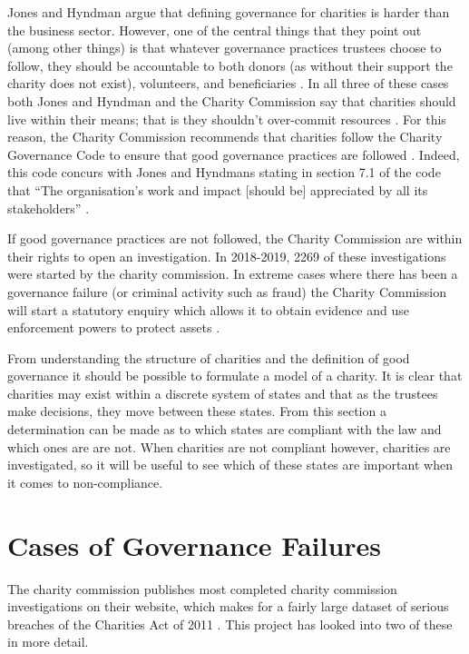 \documentclass{UoYCSproject}
\begin{document}
Jones and Hyndman argue that defining governance for charities is harder than the business sector. However, one of the central things that they point out (among other things) is that whatever governance practices trustees choose to follow, they should be accountable to both donors (as without their support the charity does not exist), volunteers, and beneficiaries \cite{hyndman_jones_2011}. In all three of these cases both Jones and Hyndman and the Charity Commission say that charities should live within their means; that is they shouldn't over-commit resources \cite{essential_trustees_guide}\cite{hyndman_jones_2011}. For this reason, the Charity Commission recommends that charities follow the Charity Governance Code to ensure that good governance practices are followed \cite{essential_trustees_guide}. Indeed, this code concurs with Jones and Hyndmans stating in section 7.1 of the code that “The organisation’s work and impact [should be] appreciated by all its stakeholders” \cite{charity_governance_code_2020_section_7}. 

If good governance practices are not followed, the Charity Commission are within their rights to open an investigation. In 2018-2019, 2269 \cite{commission_report_2019} of these investigations were started by the charity commission. In extreme cases where there has been a governance failure (or criminal activity such as fraud) the Charity Commission will start a statutory enquiry which allows it to obtain evidence and use enforcement powers to protect assets \cite{essential_trustees_guide}.

From understanding the structure of charities and the definition of good governance it should be possible to formulate a model of a charity. It is clear that charities may exist within a discrete system of states and that as the trustees make decisions, they move between these states. From this section a determination can be made as to which states are compliant with the law and which ones are are not. When charities are not compliant however, charities are investigated, so it will be useful to see which of these states are important when it comes to non-compliance.

\section{Cases of Governance Failures} \label{chap:charity_governance_failures}
The charity commission publishes most completed charity commission investigations on their website, which makes for a fairly large dataset of serious breaches of the Charities Act of 2011 \cite{gov_uk_commission_alerts}. This project has looked into two of these in more detail.
\end{document}
